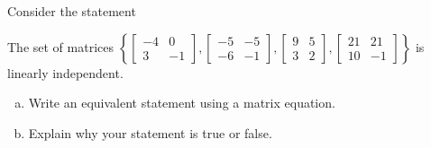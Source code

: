 
\begin{exerciseStatement}


Consider the statement 
\begin{center}\begin{minipage}{0.8\textwidth}
 The set of matrices \( \left\{ \left[\begin{array}{cc}
-4 & 0 \\
3 & -1
\end{array}\right] , \left[\begin{array}{cc}
-5 & -5 \\
-6 & -1
\end{array}\right] , \left[\begin{array}{cc}
9 & 5 \\
3 & 2
\end{array}\right] , \left[\begin{array}{cc}
21 & 21 \\
10 & -1
\end{array}\right] \right\} \) is linearly independent.
\end{minipage}\end{center}
    


\begin{enumerate}[(a)]
\item  Write an equivalent statement using a matrix equation.
\item  Explain why your statement is true or false.
\end{enumerate}
    
\end{exerciseStatement}
    
